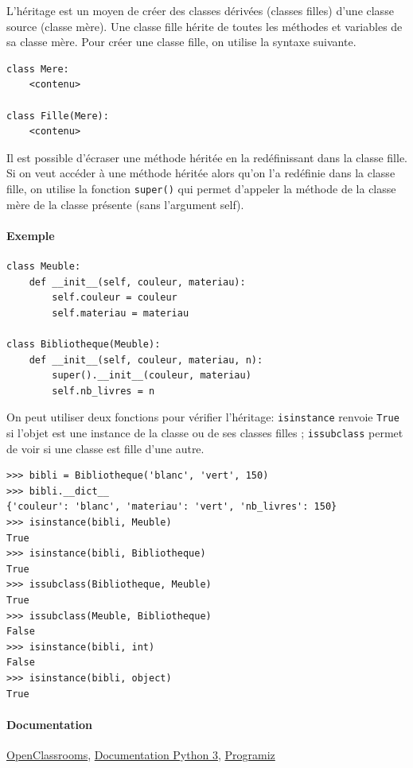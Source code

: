 \documentclass[a4paper, 10pt]{article}
\newcommand{\code}[1]{{\small\texttt{#1}}}
\begin{document}
L'héritage est un moyen de créer des classes dérivées (classes filles) d'une classe source (classe mère). Une classe fille hérite de toutes les méthodes et variables de sa classe mère. Pour créer une classe fille, on utilise la syntaxe suivante.

\begin{verbatim}
class Mere:
    <contenu>

class Fille(Mere):
    <contenu>
\end{verbatim}

Il est possible d'écraser une méthode héritée en la redéfinissant dans la classe fille. Si on veut accéder à une méthode héritée alors qu'on l'a redéfinie dans la classe fille, on utilise la fonction \code{super()} qui permet d'appeler la méthode de la classe mère de la classe présente (sans l'argument self).

\paragraph{Exemple}
\begin{verbatim}
class Meuble:
    def __init__(self, couleur, materiau):
        self.couleur = couleur
        self.materiau = materiau

class Bibliotheque(Meuble):
    def __init__(self, couleur, materiau, n):
        super().__init__(couleur, materiau)
        self.nb_livres = n
\end{verbatim}
On peut utiliser deux fonctions pour vérifier l'héritage: \code{isinstance} renvoie \code{True} si l'objet est une instance de la classe ou de ses classes filles ; \code{issubclass} permet de voir si une classe est fille d'une autre.

\begin{Verbatim}[frame = single, fontsize = \footnotesize]
>>> bibli = Bibliotheque('blanc', 'vert', 150)
>>> bibli.__dict__
{'couleur': 'blanc', 'materiau': 'vert', 'nb_livres': 150}
>>> isinstance(bibli, Meuble)
True
>>> isinstance(bibli, Bibliotheque)
True
>>> issubclass(Bibliotheque, Meuble)
True
>>> issubclass(Meuble, Bibliotheque)
False
>>> isinstance(bibli, int)
False
>>> isinstance(bibli, object)
True
\end{Verbatim}

\paragraph{Documentation} \href{https://openclassrooms.com/courses/apprenez-a-programmer-en-python/l-heritage-9}{OpenClassrooms}, \href{https://docs.python.org/fr/3/tutorial/classes.html?highlight=héritage#inheritance}{Documentation Python 3}, \href{https://www.programiz.com/python-programming/inheritance}{Programiz}
\end{document}

